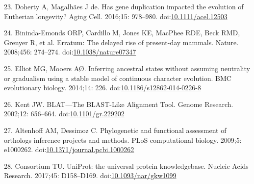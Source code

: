 \documentclass[10pt,letterpaper]{article}
\begin{document}
\leavevmode\hypertarget{ref-Doherty2016}{}%
23. Doherty A, Magalhães J de. Has gene duplication impacted the
evolution of Eutherian longevity? Aging Cell. 2016;15: 978--980.
doi:\href{https://doi.org/10.1111/acel.12503}{10.1111/acel.12503}

\leavevmode\hypertarget{ref-Bininda-Emonds2008}{}%
24. Bininda-Emonds ORP, Cardillo M, Jones KE, MacPhee RDE, Beck RMD,
Grenyer R, et al. Erratum: The delayed rise of present-day mammals.
Nature. 2008;456: 274--274.
doi:\href{https://doi.org/10.1038/nature07347}{10.1038/nature07347}

\leavevmode\hypertarget{ref-ElliotAndMooers2014}{}%
25. Elliot MG, Mooers AØ. Inferring ancestral states without assuming
neutrality or gradualism using a stable model of continuous character
evolution. BMC evolutionary biology. 2014;14: 226.
doi:\href{https://doi.org/10.1186/s12862-014-0226-8}{10.1186/s12862-014-0226-8}

\leavevmode\hypertarget{ref-blat}{}%
26. Kent JW. BLAT---The BLAST-Like Alignment Tool. Genome Research.
2002;12: 656--664.
doi:\href{https://doi.org/10.1101/gr.229202}{10.1101/gr.229202}

\leavevmode\hypertarget{ref-AltenhoffAndDessimoz2009}{}%
27. Altenhoff AM, Dessimoz C. Phylogenetic and functional assessment of
orthologs inference projects and methods. PLoS computational biology.
2009;5: e1000262.
doi:\href{https://doi.org/10.1371/journal.pcbi.1000262}{10.1371/journal.pcbi.1000262}

\leavevmode\hypertarget{ref-uniprot}{}%
28. Consortium TU. UniProt: the universal protein knowledgebase. Nucleic
Acids Research. 2017;45: D158--D169.
doi:\href{https://doi.org/10.1093/nar/gkw1099}{10.1093/nar/gkw1099}

\nolinenumbers
\end{document}
